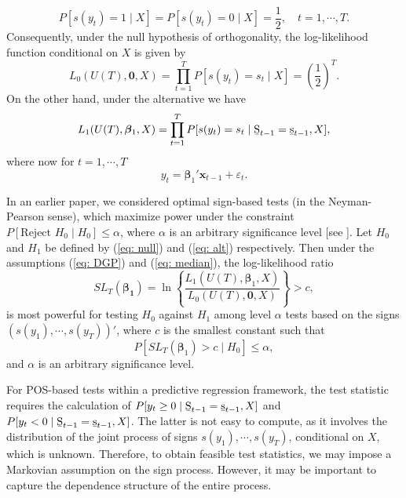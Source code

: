 \documentclass[harvard,11pt]{article}
\begin{document}
\begin{equation}
P[s(y_t)=1\mid X]=P[s(y_t)=0\mid X]=\frac{1}{2},\quad t=1,\cdots,T.
\end{equation}
Consequently, under the null hypothesis of orthogonality, the log-likelihood function conditional on $X$ is given by
\[
L_0(U(T),\bm{0},X)=\prod\limits_{t=1}^{T}P[s(y_t)=s_t\mid X]=\left(\frac{1}{2}\right)^T.
\]
On the other hand, under the alternative we have
\[
L_1(U(T),\bm{\beta}_1,X)=\prod\limits_{t=1}^{T}P[s(y_t)=s_t\mid \text{\b{S}}_{t-1}=\text{\b{s}}_{t-1}, X],
\]
where now for $t=1,\cdots,T$
\[
y_t=\bm{\beta}_1'\bm{x}_{t-1}+\varepsilon_t.
\]

In an earlier paper, we considered optimal sign-based tests (in the Neyman-Pearson sense), which maximize power under the constraint $P[\text{Reject }  H_0\mid H_0]\leq \alpha$, where $\alpha$ is an arbitrary significance level [see \citet{lehmann2006testing}]. Let $H_0$ and $H_1$ be defined by (\ref{eq: null}) and (\ref{eq: alt}) respectively. Then under the assumptions (\ref{eq: DGP}) and (\ref{eq: median}), the log-likelihood ratio
\begin{equation}\label{eq: teststat}
SL_T(\bm{\beta_1})=\ln\left\{\frac{L_1(U(T),\bm{\beta}_1,X)}{L_0(U(T),\bm{0},X)}\right\}>c,
\end{equation} 
is most powerful for testing $H_0$ against $H_1$ among level $\alpha$ tests based on the signs $(s(y_1),\cdots,s(y_T))'$, where $c$ is the smallest constant such that 
\[
P[SL_T(\bm{\beta}_1)>c\mid H_0]\leq \alpha,
\]
and $\alpha$ is an arbitrary significance level.

 For POS-based tests within a predictive regression framework, the test statistic requires the calculation of $P[y_t\geq0\mid\text{\b{S}}_{t-1}=\text{\b{s}}_{t-1},X]$ and $P[y_t<0\mid\text{\b{S}}_{t-1}=\text{\b{s}}_{t-1},X]$. The latter is not easy to compute, as it involves the distribution of the joint process of signs  $s(y_1),\cdots,s(y_T)$, conditional on $X$, which is unknown. Therefore, to obtain feasible test statistics, we may impose a Markovian assumption on the sign process. However, it may be important to capture the dependence structure of the entire process.
\end{document}
